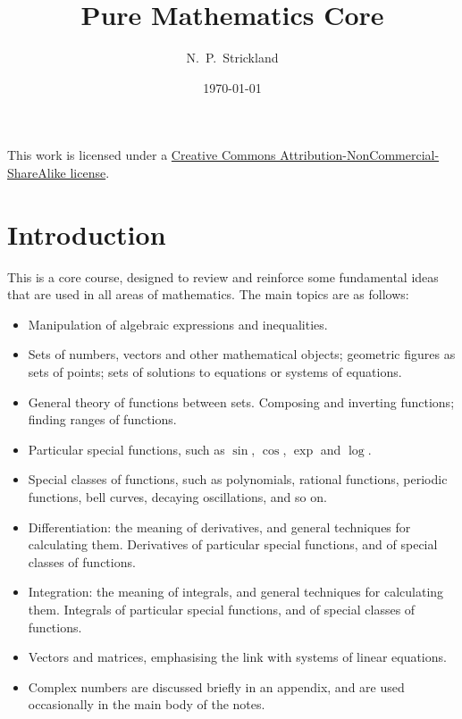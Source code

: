 \documentclass[a4paper]{book}
\renewcommand{\:}{\colon}
\theoremstyle{definition}
\begin{document}
\title{Pure Mathematics Core}
\author{N.~P.~Strickland}
\date{\today}


\maketitle

\begin{center}
 This work is licensed under a 
 \href{https://creativecommons.org/licenses/by-nc-sa/3.0/deed.en}{
  Creative Commons Attribution-NonCommercial-ShareAlike license}.
 
 \bigskip

 \doclicenseImage 
\end{center}

\tableofcontents

\chapter{Introduction}\label{chap-intro}

This is a core course, designed to review and reinforce some
fundamental ideas that are used in all areas of mathematics.  The main
topics are as follows:
\begin{itemize}
 \item Manipulation of algebraic expressions and inequalities.
 \item Sets of numbers, vectors and other mathematical objects;
  geometric figures as sets of points; sets of solutions to equations
  or systems of equations.
 \item General theory of functions between sets.  Composing and
  inverting functions; finding ranges of functions.
 \item Particular special functions, such as $\sin$, $\cos$, $\exp$
  and $\log$.
 \item Special classes of functions, such as polynomials, rational
  functions, periodic functions, bell curves, decaying oscillations,
  and so on.
 \item Differentiation: the meaning of derivatives, and general
  techniques for calculating them.  Derivatives of particular
  special functions, and of special classes of functions.
 \item Integration: the meaning of integrals, and general
  techniques for calculating them.  Integrals of particular
  special functions, and of special classes of functions.
 \item Vectors and matrices, emphasising the link with systems of
  linear equations.
 \item Complex numbers are discussed briefly in an appendix, and are
  used occasionally in the main body of the notes.
\end{itemize}
\end{document}
